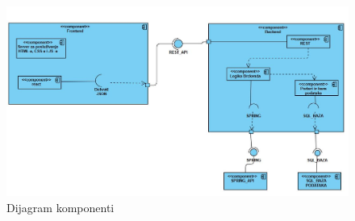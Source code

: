 			\begin{figure}[H]
				\includegraphics[width=\linewidth]{slike/dijagram komponenti.JPG}
				\centering
				\caption{Dijagram komponenti}
				\label{fig:Dijagram komponenti}
			\end{figure}			%
		
